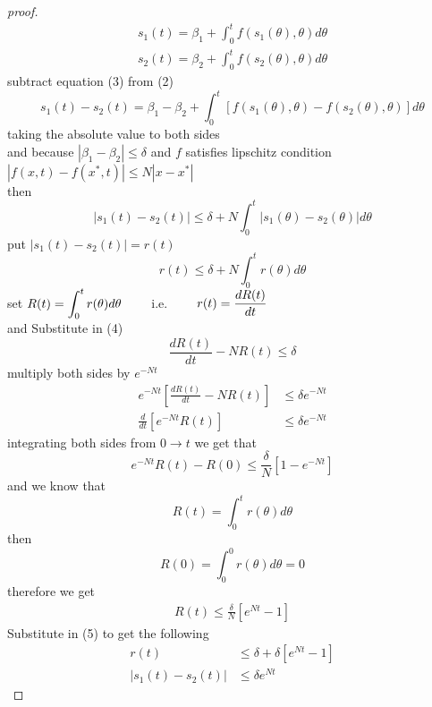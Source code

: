 \documentclass[]{article}
\begin{document}
\begin{proof}[proof]
    \begin{align}
        s_1(t) = \beta_1 + \int_{0}^{t}f(s_1(\theta),\theta)d\theta
        \\
        s_2(t) = \beta_2 + \int_{0}^{t}f(s_2(\theta),\theta)d\theta
    \end{align}
subtract equation (3) from (2)
\[
    s_1(t) - s_2(t) = \beta_1 - \beta_2 + \int_{0}^{t} \left[ f(s_1(\theta),\theta) - f(s_2(\theta),\theta)\right]d\theta    
\]
taking the absolute value to both sides
\\
and because $\left\lvert \beta_1 - \beta_2 \right\rvert \leq \delta $
and $f$ satisfies lipschitz condition $\left\lvert f(x,t) - f(x^*,t)\right\rvert \leq N\left\lvert x - x^*\right\rvert$
\\
then
\[
    |s_1(t) - s_2(t)| \leq \delta  + N \int_{0}^{t} \left\lvert s_1(\theta) - s_2(\theta) \right\rvert d\theta    
\]
put $|s_1(t) - s_2(t)| = r(t)$
\begin{equation}
    r(t) \leq \delta  + N \int_{0}^{t} r(\theta) d\theta    
\end{equation}
set $\displaystyle R(t) = \int_{0}^{t} r(\theta)d\theta \quad\quad$ i.e. $\quad\quad \displaystyle r(t) = \frac{dR(t)}{dt} $
\\ and Substitute in (4)
\begin{equation}
    \frac{dR(t)}{dt} - NR(t) \leq \delta 
\end{equation}
multiply both sides by $e^{-Nt}$
\begin{align*}
    e^{-Nt}\left[\frac{dR(t)}{dt} - NR(t)\right] &\leq \delta e^{-Nt}    
    \\
    \frac{d}{dt}\left[e^{-Nt}R(t)\right] &\leq \delta e^{-Nt}    
\end{align*}
integrating both sides from $0 \to t$ we get that 
\[
    e^{-Nt}R(t) - R(0) \leq \frac{\delta}{N}\left[1-e^{-Nt}\right]
\]
and we know that 
\[
    R(t) = \int_{0}^{t} r(\theta)d\theta
\]
then
\[
    R(0) = \int_{0}^{0} r(\theta)d\theta = 0
\]
therefore we get
\begin{align*}
    R(t) \leq \frac{\delta}{N}\left[e^{Nt}-1\right]
\end{align*}
Substitute in (5) to get the following
\begin{align*}
    r(t) &\leq \delta + \delta\left[e^{Nt}-1\right]
    \\
    |s_1(t) - s_2(t)|  &\leq \delta e^{Nt}
\end{align*}
\end{proof}
\newpage
\end{document}
